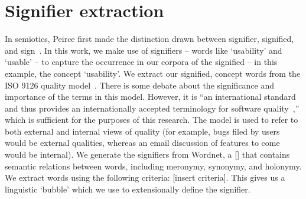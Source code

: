 \documentclass[conference, compsoc]{IEEEtran}
\begin{document}
\section{Signifier extraction}
In semiotics, Peirce first made the distinction drawn between signifier, signified, and sign~\cite{atkin2006}. In this work, we make use of signifiers -- words like `usability' and `usable' -- to capture the occurrence in our corpora of the signified -- in this example, the concept `usability'. We extract our signified, concept words from the ISO 9126 quality model~\cite{iso9126}. There is some debate about the significance and importance of the terms in this model. However, it is ``an international standard and thus provides an internationally accepted terminology for software quality~\cite[p. 58]{Boegh2008},'' which is sufficient for the purposes of this research. The model is used to refer to both external and internal views of quality (for example, bugs filed by users would be external qualities, whereas an email discussion of features to come would be internal). We generate the signifiers from Wordnet, a [] that contains semantic relations between words, including meronymy, synonymy, and holonymy. We extract words using the following criteria: [insert criteria]. This gives us a linguistic `bubble' which we use to extensionally define the signifier.

\begin{footnotesize}

\end{footnotesize}
\end{document}
